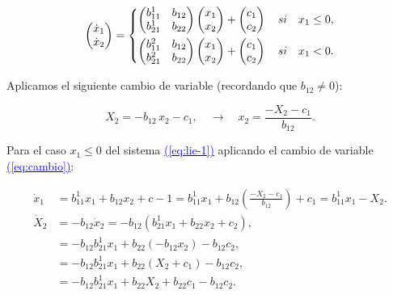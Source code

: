 \documentclass[12pt,a4paper]{report} %
\newcommand{\eref}[1]{\hyperref[#1]{\textcolor{blue}{(\ref*{#1})}}}
\newcommand{\eref}[1]{\hyperref[#1]{\textcolor{blue}{\textit{(\ref*{#1})}}}}
\begin{document}
	\begin{equation}
		\begin{pmatrix*}[r]
			\dot{x}_1 \\ \dot{x}_2
		\end{pmatrix*}=
		\label{eq:lie-1}
		\scalebox{1}{$\displaystyle
			\left\{
			\begin{aligned}
				\begin{pmatrix*}[r]
					b_{11}^1 & b_{12} \\
					b_{21}^1 & b_{22}
				\end{pmatrix*}\begin{pmatrix*}[r]
				x_1\\x_2
				\end{pmatrix*}+\begin{pmatrix*}[r]
				c_1 \\ c_2
				\end{pmatrix*} \quad si \quad x_1 \leq 0, \\
				\begin{pmatrix*}[r]
					b_{11}^2 & b_{12} \\
					b_{21}^2 & b_{22}
				\end{pmatrix*}\begin{pmatrix*}[r]
				x_1\\x_2
				\end{pmatrix*}+\begin{pmatrix*}[r]
					c_1 \\ c_2
				\end{pmatrix*} \quad si \quad x_1 < 0.
			\end{aligned}
			\right.
			$}
	\end{equation}\smallskip
	
	\noindent Aplicamos el siguiente cambio de variable (recordando que $b_{12}\neq0$): 
	
	\begin{equation}
		\label{eq:cambio}
		X_2=-b_{12}\,x_2-c_1,\quad \rightarrow \quad x_2=\frac{-X_2-c_1}{b_{12}}.
	\end{equation}\smallskip

	\noindent Para el caso $x_1\leq 0$ del sistema \eref{eq:lie-1} aplicando el cambio de variable \eref{eq:cambio}:
	
	\begin{equation}
		\label{eq:q1}
	\begin{aligned}
		\dot{x}_1&=b_{11}^1x_1+b_{12}x_2+c-1=b_{11}^1x_1+b_{12}\left(\frac{-X_2-c_1}{b_{12}}\right)+c_1=b_{11}^1x_1-X_2. \\[2mm]
		\dot{X}_2&=-b_{12}\dot{x}_2=-b_{12}\left(b_{21}^1x_1+b_{22}x_2+c_2\right), \\[2mm]
		&=-b_{12}b_{21}^1x_1+b_{22}\left(-b_{12}x_2\right)-b_{12}c_2,  \\[2mm]
		&=-b_{12}b_{21}^1x_1+b_{22}\left(X_2+c_1\right)-b_{12}c_2, \\[2mm]
		&=-b_{12}b_{21}^1x_1+b_{22}X_2+b_{22}c_1-b_{12}c_2.
	\end{aligned}
	\end{equation}\smallskip
	
\end{document}
